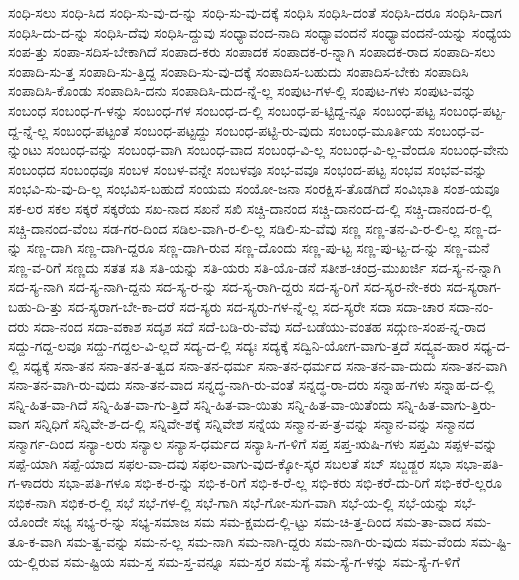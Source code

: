 {ಸಂಧಿ-ಸಲು
ಸಂಧಿ-ಸಿದ
ಸಂಧಿ-ಸು-ವು-ದ-ನ್ನು
ಸಂಧಿ-ಸು-ವು-ದಕ್ಕೆ
ಸಂಧಿಸಿ
ಸಂಧಿಸಿ-ದಂತೆ
ಸಂಧಿಸಿ-ದರೂ
ಸಂಧಿಸಿ-ದಾಗ
ಸಂಧಿಸಿ-ದು-ದ-ನ್ನು
ಸಂಧಿಸಿ-ದೆವು
ಸಂಧಿಸಿ-ದ್ದುವು
ಸಂಧ್ಯಾವಂದ-ನಾದಿ
ಸಂಧ್ಯಾವಂದನೆ
ಸಂಧ್ಯಾವಂದನೆ-ಯನ್ನು
ಸಂಧ್ಯೆಯ
ಸಂಪ-ತ್ತು
ಸಂಪಾ-ಸದಿಸ-ಬೇಕಾಗಿದೆ
ಸಂಪಾದ-ಕರು
ಸಂಪಾದಕ
ಸಂಪಾದಕ-ರ-ನ್ನಾಗಿ
ಸಂಪಾದಕ-ರಾದ
ಸಂಪಾದಿ-ಸಲು
ಸಂಪಾದಿ-ಸು-ತ್ತ
ಸಂಪಾದಿ-ಸು-ತ್ತಿದ್ದ
ಸಂಪಾದಿ-ಸು-ವು-ದಕ್ಕೆ
ಸಂಪಾದಿಸ-ಬಹುದು
ಸಂಪಾದಿಸ-ಬೇಕು
ಸಂಪಾದಿಸಿ
ಸಂಪಾದಿಸಿ-ಕೊಂಡು
ಸಂಪಾದಿಸಿ-ದನು
ಸಂಪಾದಿಸಿ-ದುದ-ನ್ನೆ-ಲ್ಲ
ಸಂಪುಟ-ಗಳ-ಲ್ಲಿ
ಸಂಪುಟ-ಗಳು
ಸಂಪುಟ-ವನ್ನು
ಸಂಬಂಧ
ಸಂಬಂಧ-ಗ-ಳನ್ನು
ಸಂಬಂಧ-ಗಳ
ಸಂಬಂಧ-ದ-ಲ್ಲಿ
ಸಂಬಂಧ-ಪ-ಟ್ಟಿದ್ದ-ನ್ನೂ
ಸಂಬಂಧ-ಪಟ್ಟ
ಸಂಬಂಧ-ಪಟ್ಟ-ದ್ದ-ನ್ನೆ-ಲ್ಲ
ಸಂಬಂಧ-ಪಟ್ಟಂತೆ
ಸಂಬಂಧ-ಪಟ್ಟದ್ದು
ಸಂಬಂಧ-ಪಟ್ಟಿ-ರು-ವುದು
ಸಂಬಂಧ-ಮೂರ್ತಿಯ
ಸಂಬಂಧ-ವ-ನ್ನುಂಟು
ಸಂಬಂಧ-ವನ್ನು
ಸಂಬಂಧ-ವಾಗಿ
ಸಂಬಂಧ-ವಾದ
ಸಂಬಂಧ-ವಿ-ಲ್ಲ
ಸಂಬಂಧ-ವಿ-ಲ್ಲ-ವೆಂದೂ
ಸಂಬಂಧ-ವೇನು
ಸಂಬಂಧದ
ಸಂಬಂಧವೂ
ಸಂಬಳ
ಸಂಬಳ-ವನ್ನೇ
ಸಂಬಳವೂ
ಸಂಭ-ವವೂ
ಸಂಭಂದ-ಪಟ್ಟ
ಸಂಭವ
ಸಂಭವ-ವನ್ನು
ಸಂಭವಿ-ಸು-ವು-ದಿ-ಲ್ಲ
ಸಂಭವಿಸ-ಬಹುದೆ
ಸಂಯಮ
ಸಂಯೋ-ಜನಾ
ಸಂರಕ್ಷಿಸ-ತೊಡಗಿದೆ
ಸಂವಿಭಾತಿ
ಸಂಶ-ಯವೂ
ಸಕ-ಲರ
ಸಕಲ
ಸಕ್ಕರೆ
ಸಕ್ಕರೆಯ
ಸಖ-ನಾದ
ಸಖನೆ
ಸಖಿ
ಸಚ್ಚಿ-ದಾನಂದ
ಸಚ್ಚಿ-ದಾನಂದ-ದ-ಲ್ಲಿ
ಸಚ್ಚಿ-ದಾನಂದ-ರ-ಲ್ಲಿ
ಸಚ್ಚಿ-ದಾನಂದ-ವೆಂಬ
ಸಡ-ಗರ-ದಿಂದ
ಸಡಿಲ-ವಾಗಿ-ರ-ಲಿ-ಲ್ಲ
ಸಡಿಲಿ-ಸು-ವೆವು
ಸಣ್ಣ
ಸಣ್ಣ-ತನ-ವಿ-ರ-ಲಿ-ಲ್ಲ
ಸಣ್ಣ-ದ-ನ್ನು
ಸಣ್ಣ-ದಾಗಿ
ಸಣ್ಣ-ದಾಗಿ-ದ್ದರೂ
ಸಣ್ಣ-ದಾಗಿ-ರುವ
ಸಣ್ಣ-ದೊಂದು
ಸಣ್ಣ-ಪು-ಟ್ಟ
ಸಣ್ಣ-ಪು-ಟ್ಟ-ದ-ನ್ನು
ಸಣ್ಣ-ಮನೆ
ಸಣ್ಣ-ವ-ರಿಗೆ
ಸಣ್ಣದು
ಸತತ
ಸತಿ
ಸತಿ-ಯನ್ನು
ಸತಿ-ಯರು
ಸತಿ-ಯೊ-ಡನೆ
ಸತೀಶ-ಚಂದ್ರ-ಮುಖರ್ಜಿ
ಸದ-ಸ್ಯ-ನ-ನ್ನಾಗಿ
ಸದ-ಸ್ಯ-ನಾಗಿ
ಸದ-ಸ್ಯ-ನಾಗಿ-ದ್ದನು
ಸದ-ಸ್ಯ-ರ-ನ್ನು
ಸದ-ಸ್ಯ-ರಾಗಿ-ದ್ದರು
ಸದ-ಸ್ಯ-ರಿಗೆ
ಸದ-ಸ್ಯರ-ನೇ-ಕರು
ಸದ-ಸ್ಯರಾಗ-ಬಹು-ದಿ-ತ್ತು
ಸದ-ಸ್ಯರಾಗ-ಬೇ-ಕಾ-ದರೆ
ಸದ-ಸ್ಯರು
ಸದ-ಸ್ಯರು-ಗಳ-ನ್ನೆ-ಲ್ಲ
ಸದ-ಸ್ಯರೇ
ಸದಾ
ಸದಾ-ಚಾರ
ಸದಾ-ನಂ-ದರು
ಸದಾ-ನಂದ
ಸದಾ-ವಕಾಶ
ಸದೃಶ
ಸದೆ
ಸದೆ-ಬಡಿ-ರು-ವೆವು
ಸದೆ-ಬಡೆಯು-ವಂತಹ
ಸದ್ಗುಣ-ಸಂಪ-ನ್ನ-ರಾದ
ಸದ್ದು-ಗದ್ದ-ಲವೂ
ಸದ್ದು-ಗದ್ದಲ-ವಿ-ಲ್ಲದೆ
ಸದ್ಯ-ದ-ಲ್ಲಿ
ಸದ್ಯಃ
ಸದ್ಯಕ್ಕೆ
ಸದ್ವಿನಿ-ಯೋಗ-ವಾಗು-ತ್ತದೆ
ಸದ್ವ್ಯವ-ಹಾರ
ಸಧ್ಯ-ದ-ಲ್ಲಿ
ಸಧ್ಯಕ್ಕೆ
ಸನಾ-ತನ
ಸನಾ-ತನ-ತ-ತ್ವದ
ಸನಾ-ತನ-ಧರ್ಮ
ಸನಾ-ತನ-ಧರ್ಮದ
ಸನಾ-ತನ-ವಾ-ದುದು
ಸನಾ-ತನ-ವಾಗಿ
ಸನಾ-ತನ-ವಾಗಿ-ರು-ವುದು
ಸನಾ-ತನ-ವಾದ
ಸನ್ನದ್ಧ-ನಾಗಿ-ರು-ವಂತೆ
ಸನ್ನದ್ಧ-ರಾ-ದರು
ಸನ್ನಾಹ-ಗಳು
ಸನ್ನಾಹ-ದ-ಲ್ಲಿ
ಸನ್ನಿ-ಹಿತ-ವಾ-ಗಿದೆ
ಸನ್ನಿ-ಹಿತ-ವಾ-ಗು-ತ್ತಿದೆ
ಸನ್ನಿ-ಹಿತ-ವಾ-ಯಿತು
ಸನ್ನಿ-ಹಿತ-ವಾ-ಯಿತೆಂದು
ಸನ್ನಿ-ಹಿತ-ವಾಗು-ತ್ತಿರು-ವಾಗ
ಸನ್ನಿಧಿಗೆ
ಸನ್ನಿವೇ-ಶ-ದ-ಲ್ಲಿ
ಸನ್ನಿವೇ-ಶಕ್ಕೆ
ಸನ್ನಿವೇಶ
ಸನ್ನೆಯ
ಸನ್ಮಾನ-ಪ-ತ್ರ-ವನ್ನು
ಸನ್ಮಾನ-ವನ್ನು
ಸನ್ಮಾನದ
ಸನ್ಮಾರ್ಗ-ದಿಂದ
ಸನ್ಯಾ-ಲರು
ಸನ್ಯಾಲ
ಸನ್ಯಾಸ-ಧರ್ಮದ
ಸನ್ಯಾಸಿ-ಗ-ಳಿಗೆ
ಸಪ್ತ
ಸಪ್ತ-ಋಷಿ-ಗಳು
ಸಪ್ತಮಿ
ಸಪ್ಪಳ-ವನ್ನು
ಸಪ್ಪೆ-ಯಾಗಿ
ಸಪ್ಪೆ-ಯಾದ
ಸಫಲ-ವಾ-ದವು
ಸಫಲ-ವಾಗು-ವುದ-ಕ್ಕೋ-ಸ್ಕರ
ಸಬಲತೆ
ಸಬ್
ಸಬ್ಜಡ್ಜರ
ಸಭಾ
ಸಭಾ-ಪತಿ-ಗ-ಳಾದರು
ಸಭಾ-ಪತಿ-ಗಳೂ
ಸಭಿ-ಕ-ರ-ನ್ನು
ಸಭಿ-ಕ-ರಿಗೆ
ಸಭಿ-ಕ-ರೆ-ಲ್ಲ
ಸಭಿ-ಕರು
ಸಭಿ-ಕರೆ-ದು-ರಿಗೆ
ಸಭಿ-ಕರೆ-ಲ್ಲರೂ
ಸಭಿಕ-ನಾಗಿ
ಸಭಿಕ-ರ-ಲ್ಲಿ
ಸಭೆ
ಸಭೆ-ಗಳ-ಲ್ಲಿ
ಸಭೆ-ಗಾಗಿ
ಸಭೆ-ಗೋ-ಸುಗ-ವಾಗಿ
ಸಭೆ-ಯ-ಲ್ಲಿ
ಸಭೆ-ಯನ್ನು
ಸಭೆ-ಯೊಂದೇ
ಸಭ್ಯ
ಸಭ್ಯ-ರ-ನ್ನು
ಸಭ್ಯ-ಸಮಾಜ
ಸಮ
ಸಮ-ಕ್ಷಮದ-ಲ್ಲಿ-ಟ್ಟು
ಸಮ-ಚಿ-ತ್ತ-ದಿಂದ
ಸಮ-ತಾ-ವಾದ
ಸಮ-ತೂ-ಕ-ವಾಗಿ
ಸಮ-ತ್ವ-ವನ್ನು
ಸಮ-ನ-ಲ್ಲ
ಸಮ-ನಾಗಿ
ಸಮ-ನಾಗಿ-ದ್ದರು
ಸಮ-ನಾಗಿ-ರು-ವುದು
ಸಮ-ವೆಂದು
ಸಮ-ಷ್ಟಿ-ಯ-ಲ್ಲಿರುವ
ಸಮ-ಷ್ಟಿಯ
ಸಮ-ಸ್ತ
ಸಮ-ಸ್ತ-ವನ್ನೂ
ಸಮ-ಸ್ತರ
ಸಮ-ಸ್ಯೆ
ಸಮ-ಸ್ಯೆ-ಗ-ಳನ್ನು
ಸಮ-ಸ್ಯೆ-ಗ-ಳಿಗೆ
}
